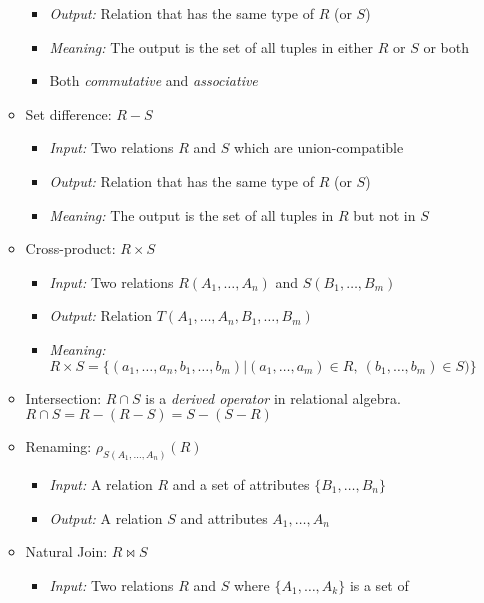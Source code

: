 \documentclass[landscape,8pt]{extarticle}
\begin{document}
\begin{multicols}{4}
\begin{itemize}
\begin{itemize}
\begin{itemize}
                \item \emph{Output:} Relation that has the same type of $R$ (or $S$)
                \item \emph{Meaning:} The output is the set of all tuples in either $R$ or $S$ or
                both
                \item Both \emph{commutative} and \emph{associative}
            \end{itemize}
            \item Set difference: $R - S$
            \begin{itemize}
                \item \emph{Input:} Two relations $R$ and $S$ which are union-compatible
                \item \emph{Output:} Relation that has the same type of $R$ (or $S$)
                \item \emph{Meaning:} The output is the set of all tuples in $R$ but not in $S$
            \end{itemize}
            \item Cross-product: $R \times S$
            \begin{itemize}
                \item \emph{Input:} Two relations $R(A_1, \dots, A_n)$ and $S(B_1, \dots, B_m)$
                \item \emph{Output:} Relation $T(A_1, \dots, A_n, B_1, \dots, B_m)$
                \item \emph{Meaning:} $R \times S = \{(a_1, \dots, a_n, b_1, \dots, b_m) | (a_1,
                \dots, a_m) \in R,\ (b_1, \dots, b_m) \in S) \}$
            \end{itemize}
            \item Intersection: $R \cap S$ is a \emph{derived operator} in relational algebra.\\
            $R \cap S = R - (R - S) = S - (S - R)$
        \item Renaming: $\rho_{S(A_1, \dots, A_n)}(R)$
        \begin{itemize}
            \item \emph{Input:} A relation $R$ and a set of attributes $\{B_1, \dots, B_n\}$
            \item \emph{Output:} A relation $S$ and attributes $A_1, \dots, A_n$
        \end{itemize}
        \item Natural Join: $R \bowtie S$
        \begin{itemize}
            \item \emph{Input:} Two relations $R$ and $S$ where $\{A_1, \dots, A_k\}$ is a set of

\end{itemize}
\end{itemize}
\end{itemize}
\end{multicols}
\end{document}
